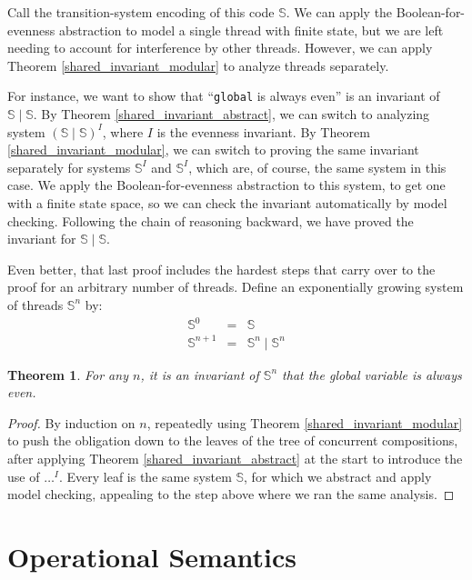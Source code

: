 \documentclass{amsbook}
\newtheorem{theorem}{Theorem}[chapter]
\theoremstyle{definition}
\theoremstyle{remark}
\numberwithin{section}{chapter}
\numberwithin{equation}{chapter}
\begin{document}
Call the transition-system encoding of this code $\mathbb S$.
We can apply the Boolean-for-evenness abstraction to model a single thread with finite state, but we are left needing to account for interference by other threads.
However, we can apply Theorem \ref{shared_invariant_modular} to analyze threads separately.

For instance, we want to show that ``\texttt{global} is always even'' is an invariant of ${\mathbb S} \mid {\mathbb S}$.
By Theorem \ref{shared_invariant_abstract}, we can switch to analyzing system $({\mathbb S} \mid {\mathbb S})^I$, where $I$ is the evenness invariant.
By Theorem \ref{shared_invariant_modular}, we can switch to proving the same invariant separately for systems ${\mathbb S}^I$ and ${\mathbb S}^I$, which are, of course, the same system in this case.
We apply the Boolean-for-evenness abstraction to this system, to get one with a finite state space, so we can check the invariant automatically by model checking.
Following the chain of reasoning backward, we have proved the invariant for ${\mathbb S} \mid {\mathbb S}$.

Even better, that last proof includes the hardest steps that carry over to the proof for an arbitrary number of threads.
Define an exponentially growing system of threads ${\mathbb S}^n$ by:
\begin{eqnarray*}
  {\mathbb S}^0 &=& \mathbb S \\
  {\mathbb S}^{n+1} &=& {\mathbb S}^n \mid {\mathbb S}^n
\end{eqnarray*}

\begin{theorem}
  For any $n$, it is an invariant of ${\mathbb S}^n$ that the global variable is always even.
\end{theorem}

\begin{proof}
  By induction on $n$, repeatedly using Theorem \ref{shared_invariant_modular} to push the obligation down to the leaves of the tree of concurrent compositions, after applying Theorem \ref{shared_invariant_abstract} at the start to introduce the use of $\ldots^I$.
  Every leaf is the same system $\mathbb S$, for which we abstract and apply model checking, appealing to the step above where we ran the same analysis.
\end{proof}



\chapter{\label{operational_semantics}Operational Semantics}
\end{document}
